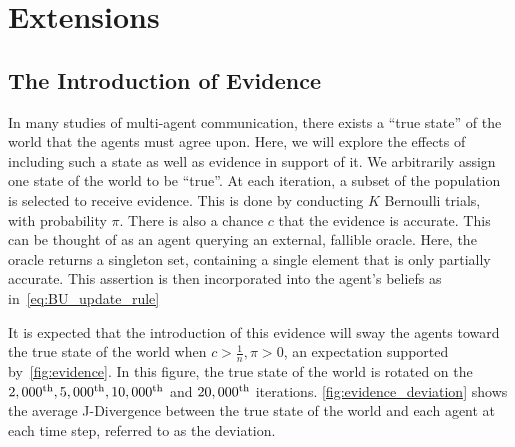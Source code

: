 \chapter{Extensions}

\section{The Introduction of Evidence} \label{sect:evidence}

In many studies of multi-agent communication, there exists a ``true state'' of the world that the agents must agree upon. Here, we will explore the effects of including such a state as well as evidence in support of it. We arbitrarily assign one state of the world to be ``true''. At each iteration, a subset of the population is selected to receive evidence. This is done by conducting $K$ Bernoulli trials, with probability $\pi$. There is also a chance $c$ that the evidence is accurate. This can be thought of as an agent querying an external, fallible oracle. Here, the oracle returns a singleton set, containing a single element that is only partially accurate. This assertion is then incorporated into the agent's beliefs as in~\cref{eq:BU_update_rule}

It is expected that the introduction of this evidence will sway the agents toward the true state of the world when $c > \frac{1}{n}, \pi > 0$, an expectation supported by~\cref{fig:evidence}. In this figure, the true state of the world is rotated on the $2,000^{\textnormal{th}},5,000^{\textnormal{th}},10,000^{\textnormal{th}} $ and $ 20,000^{\textnormal{th}}$ iterations. \cref{fig:evidence_deviation} shows the average J-Divergence between the true state of the world and each agent at each time step, referred to as the deviation. 


